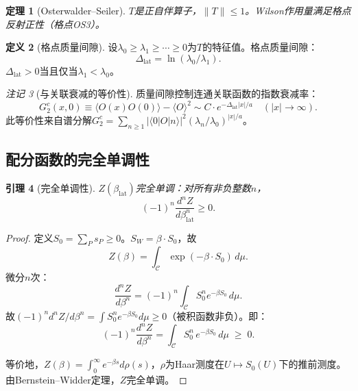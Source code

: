 \documentclass[12pt,a4paper]{article}
\theoremstyle{plain}
\newtheorem{theorem}{定理}[section]\newtheorem{lemma}[theorem]{引理}\newtheorem{corollary}[theorem]{推论}\newtheorem{proposition}[theorem]{命题}
\theoremstyle{definition}\newtheorem{definition}[theorem]{定义}
\theoremstyle{remark}\newtheorem{remark}[theorem]{注记}
\begin{document}
\begin{theorem}[Osterwalder--Seiler\cite{OsterwalderSeiler1978}]\label{thm:OS}
$T$是正自伴算子，$\|T\|\leq 1$。Wilson作用量满足格点反射正性（格点OS3）。
\end{theorem}

\begin{definition}[格点质量间隙]\label{def:gap}
设$\lambda_0\geq\lambda_1\geq\cdots\geq 0$为$T$的特征值。格点质量间隙：
\begin{equation}\label{eq:gapdef}
\Delta_{\mathrm{lat}} = \ln(\lambda_0/\lambda_1).
\end{equation}
$\Delta_{\mathrm{lat}}>0$当且仅当$\lambda_1<\lambda_0$。
\end{definition}

\begin{remark}[与关联衰减的等价性]
质量间隙控制连通关联函数的指数衰减率：
\begin{equation}\label{eq:expdecay}
G_2^c(x,0) \equiv \langle O(x)O(0)\rangle - \langle O\rangle^2 \sim C\cdot e^{-\Delta_{\mathrm{lat}}|x|/a} \quad (|x|\to\infty).
\end{equation}
此等价性来自谱分解$G_2^c=\sum_{n\geq 1}|\langle 0|O|n\rangle|^2(\lambda_n/\lambda_0)^{|x|/a}$。
\end{remark}

\subsection{配分函数的完全单调性}\label{sec:cm}

\begin{lemma}[完全单调性]\label{lem:cm}
$Z(\beta_{\mathrm{lat}})$完全单调：对所有非负整数$n$，
\begin{equation}\label{eq:cm}
(-1)^n \frac{d^nZ}{d\beta_{\mathrm{lat}}^n} \geq 0.
\end{equation}
\end{lemma}

\begin{proof}
定义$S_0=\sum_P s_P\geq 0$。$S_W=\beta\cdot S_0$，故
\begin{equation}\label{eq:Zlaplace}
Z(\beta) = \int_{\mathcal{C}} \exp(-\beta\cdot S_0)\,d\mu.
\end{equation}
微分$n$次：
\begin{equation}\label{eq:cmderiv}
\frac{d^nZ}{d\beta^n} = (-1)^n\int_{\mathcal{C}} S_0^n e^{-\beta S_0}\,d\mu.
\end{equation}
故$(-1)^n d^nZ/d\beta^n = \int S_0^n e^{-\beta S_0}d\mu \geq 0$（被积函数非负）。即：
\begin{equation}
(-1)^n\frac{d^nZ}{d\beta^n} = \int_{\mathcal{C}} S_0^n\,e^{-\beta S_0}\,d\mu \;\geq\; 0.
\end{equation}

等价地，$Z(\beta)=\int_0^\infty e^{-\beta s}d\rho(s)$，$\rho$为Haar测度在$U\mapsto S_0(U)$下的推前测度。由Bernstein--Widder定理\cite{Bernstein1929,Widder1941}，$Z$完全单调。
\end{proof}
\end{document}
